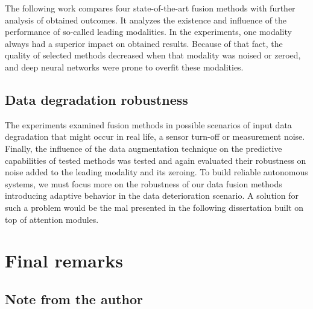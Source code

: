 \documentclass[a4paper, 10pt, twoside]{report}
\begin{document}
The following work compares four state-of-the-art fusion methods with further analysis of obtained outcomes. It analyzes the existence and influence of the performance of so-called leading modalities. In the experiments, one modality always had a superior impact on obtained results. Because of that fact, the quality of selected methods decreased when that modality was noised or zeroed, and deep neural networks were prone to overfit these modalities. 

\section{Data degradation robustness}

The experiments examined fusion methods in possible scenarios of input data degradation that might occur in real life, \eg a sensor turn-off or measurement noise. Finally, the influence of the data augmentation technique on the predictive capabilities of tested methods was tested and again evaluated their robustness on noise added to the leading modality and its zeroing. To build reliable autonomous systems, we must focus more on the robustness of our data fusion methods introducing adaptive behavior in the data deterioration scenario. A solution for such a problem would be the \acrshort{mal} presented in the following dissertation built on top of attention modules.

\chapter{Final remarks}
\label{part:conclusions:remarks}

\section{Note from the author}
\end{document}
